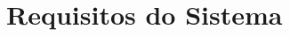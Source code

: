 \documentclass[
	article,			%
	11pt,				%
	oneside,			%
	a4paper,			%
	english,			%
	brazil,				%
	sumario=tradicional
	]{abntex2}
\begin{document}
\frenchspacing 


%
%
\maketitle

 
 


\textual




\section{Requisitos do Sistema}
\end{document}
